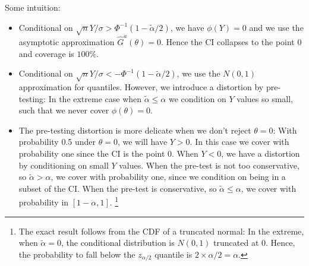 \documentclass[12pt,a4paper,english]{article} %
\numberwithin{equation}{section}
\theoremstyle{definition}
\theoremstyle{remark}
\theoremstyle{plain}
\begin{document}
Some intuition:
\begin{itemize}
  \item Conditional on $\sqrt{n}Y/\sigma > \Phi^{-1}(1-\tilde{\alpha}/2)$, we have $\phi(Y) = 0$ and we use the asymptotic approximation $\hat{G}^a(\theta) = 0$. Hence the CI collapses to the point $0$ and coverage is $100\%$.
  \item Conditional on $\sqrt{n}Y/\sigma < -\Phi^{-1}(1-\tilde{\alpha}/2)$, we use the $N(0,1)$ approximation for quantiles. However, we introduce a distortion by pre-testing: In the extreme case when $\tilde{\alpha} \leq \alpha$ we condition on $Y$ values so small, such that we never cover $\phi(\theta)=0$.
  \item The pre-testing distortion is more delicate when we don't reject $\theta=0$: With probability 0.5 under $\theta=0$, we will have $Y>0$. In this case we cover with probability one since the CI is the point $0$.
  When $Y<0$, we have a distortion by conditioning on small $Y$ values. When the pre-test is not too conservative, so $\tilde{\alpha} > \alpha$, we cover with probability one, since we condition on being in a subset of the CI.
  When the pre-test is conservative, so $\tilde{\alpha} \leq \alpha$, we cover with probability in $[1-\alpha, 1]$.
\footnote{The exact result follows from the CDF of a truncated normal: In the extreme, when $\tilde{\alpha} = 0$, the conditional distribution is $N(0,1)$ truncated at $0$.
  Hence, the probability to fall below the $z_{\alpha/2}$ quantile is $2\times\alpha/2 = \alpha$.
}
\end{itemize}



\end{document}
